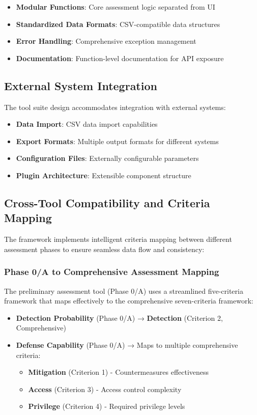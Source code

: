 \documentclass[binding=0.6cm]{sapthesis}
\begin{document}
\begin{itemize}
    \item \textbf{Modular Functions}: Core assessment logic separated from UI
    \item \textbf{Standardized Data Formats}: CSV-compatible data structures
    \item \textbf{Error Handling}: Comprehensive exception management
    \item \textbf{Documentation}: Function-level documentation for API exposure
\end{itemize}

\subsection{External System Integration}

The tool suite design accommodates integration with external systems:

\begin{itemize}
    \item \textbf{Data Import}: CSV data import capabilities
    \item \textbf{Export Formats}: Multiple output formats for different systems
    \item \textbf{Configuration Files}: Externally configurable parameters
    \item \textbf{Plugin Architecture}: Extensible component structure
\end{itemize}

\subsection{Cross-Tool Compatibility and Criteria Mapping}

The framework implements intelligent criteria mapping between different assessment phases to ensure seamless data flow and consistency:

\subsubsection{Phase 0/A to Comprehensive Assessment Mapping}

The preliminary assessment tool (Phase 0/A) uses a streamlined five-criteria framework that maps effectively to the comprehensive seven-criteria framework:

\begin{itemize}
    \item \textbf{Detection Probability} (Phase 0/A) → \textbf{Detection} (Criterion 2, Comprehensive)
    \item \textbf{Defense Capability} (Phase 0/A) → Maps to multiple comprehensive criteria:
    \begin{itemize}
        \item \textbf{Mitigation} (Criterion 1) - Countermeasures effectiveness
        \item \textbf{Access} (Criterion 3) - Access control complexity  
        \item \textbf{Privilege} (Criterion 4) - Required privilege levels
    \end{itemize}
\end{itemize}
\end{document}
